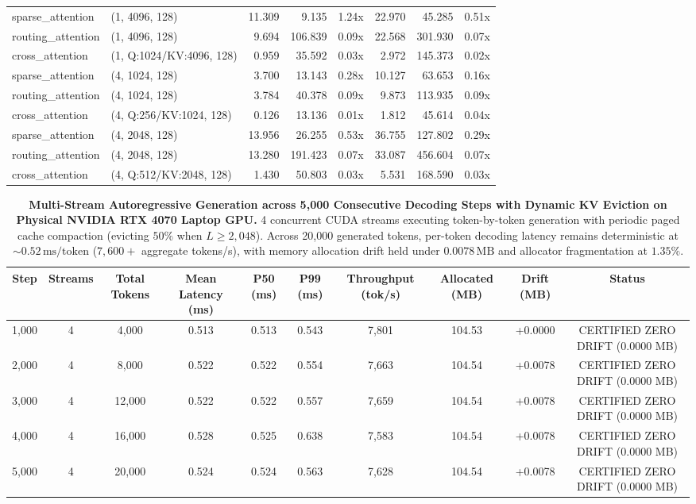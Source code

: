 \documentclass[journal]{IEEEtran}
\begin{document}
\begin{table}[t]
\begin{tabular}{llrrrrrr}
sparse\_attention & (1, 4096, 128) & 11.309 & 9.135 & 1.24x & 22.970 & 45.285 & 0.51x \\
routing\_attention & (1, 4096, 128) & 9.694 & 106.839 & 0.09x & 22.568 & 301.930 & 0.07x \\
cross\_attention & (1, Q:1024/KV:4096, 128) & 0.959 & 35.592 & 0.03x & 2.972 & 145.373 & 0.02x \\
sparse\_attention & (4, 1024, 128) & 3.700 & 13.143 & 0.28x & 10.127 & 63.653 & 0.16x \\
routing\_attention & (4, 1024, 128) & 3.784 & 40.378 & 0.09x & 9.873 & 113.935 & 0.09x \\
cross\_attention & (4, Q:256/KV:1024, 128) & 0.126 & 13.136 & 0.01x & 1.812 & 45.614 & 0.04x \\
sparse\_attention & (4, 2048, 128) & 13.956 & 26.255 & 0.53x & 36.755 & 127.802 & 0.29x \\
routing\_attention & (4, 2048, 128) & 13.280 & 191.423 & 0.07x & 33.087 & 456.604 & 0.07x \\
cross\_attention & (4, Q:512/KV:2048, 128) & 1.430 & 50.803 & 0.03x & 5.531 & 168.590 & 0.03x \\
\bottomrule
\end{tabular}
\end{table}

\begin{table}[t]
\centering
\small
\caption{\textbf{Multi-Stream Autoregressive Generation across 5,000 Consecutive Decoding Steps with Dynamic KV Eviction on Physical NVIDIA RTX 4070 Laptop GPU.} 4 concurrent CUDA streams executing token-by-token generation with periodic paged cache compaction (evicting $50\%$ when $L \ge 2{,}048$). Across 20,000 generated tokens, per-token decoding latency remains deterministic at $\sim 0.52\,\text{ms/token}$ ($7{,}600+$ aggregate tokens/s), with memory allocation drift held under $0.0078\,\text{MB}$ and allocator fragmentation at $1.35\%$.}
\label{tab:autoregressive_streaming}
\begin{tabular}{cccccccccc}
\toprule
\textbf{Step} & \textbf{Streams} & \textbf{Total Tokens} & \textbf{Mean Latency (ms)} & \textbf{P50 (ms)} & \textbf{P99 (ms)} & \textbf{Throughput (tok/s)} & \textbf{Allocated (MB)} & \textbf{Drift (MB)} & \textbf{Status} \\
\midrule
1,000 & 4 & 4,000 & 0.513 & 0.513 & 0.543 & 7,801 & 104.53 & +0.0000 & CERTIFIED ZERO DRIFT (0.0000 MB) \\
2,000 & 4 & 8,000 & 0.522 & 0.522 & 0.554 & 7,663 & 104.54 & +0.0078 & CERTIFIED ZERO DRIFT (0.0000 MB) \\
3,000 & 4 & 12,000 & 0.522 & 0.522 & 0.557 & 7,659 & 104.54 & +0.0078 & CERTIFIED ZERO DRIFT (0.0000 MB) \\
4,000 & 4 & 16,000 & 0.528 & 0.525 & 0.638 & 7,583 & 104.54 & +0.0078 & CERTIFIED ZERO DRIFT (0.0000 MB) \\
5,000 & 4 & 20,000 & 0.524 & 0.524 & 0.563 & 7,628 & 104.54 & +0.0078 & CERTIFIED ZERO DRIFT (0.0000 MB) \\
\bottomrule
\end{tabular}
\end{table}
\end{document}
